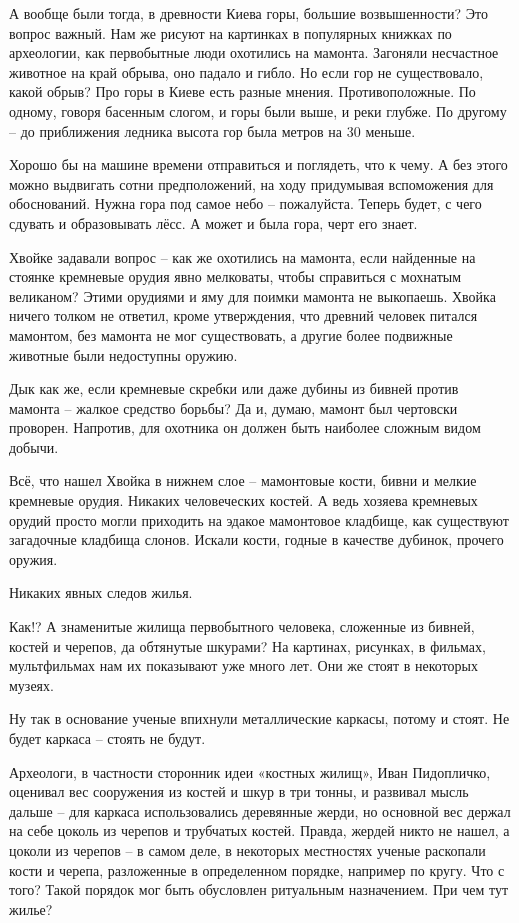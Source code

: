 А вообще были тогда, в древности Киева горы, большие возвышенности? Это вопрос важный. Нам же рисуют на картинках в популярных книжках по археологии, как первобытные люди охотились на мамонта. Загоняли несчастное животное на край обрыва, оно падало и гибло. Но если гор не существовало, какой обрыв? Про горы в Киеве есть разные мнения. Противоположные. По одному, говоря басенным слогом, и горы были выше, и реки глубже. По другому – до приближения ледника высота гор была метров на 30 меньше.

Хорошо бы на машине времени отправиться и поглядеть, что к чему. А без этого можно выдвигать сотни предположений, на ходу придумывая вспоможения для обоснований. Нужна гора под самое небо – пожалуйста. Теперь будет, с чего сдувать и образовывать лёсс. А может и была гора, черт его знает.

Хвойке задавали вопрос – как же охотились на мамонта, если найденные на стоянке кремневые орудия явно мелковаты, чтобы справиться с мохнатым великаном? Этими орудиями и яму для поимки мамонта не выкопаешь. Хвойка ничего толком не ответил, кроме утверждения, что древний человек питался мамонтом, без мамонта не мог существовать, а другие более подвижные животные были недоступны оружию.

Дык как же, если кремневые скребки или даже дубины из бивней против мамонта – жалкое средство борьбы? Да и, думаю, мамонт был чертовски проворен. Напротив, для охотника он должен быть наиболее сложным видом добычи.

Всё, что нашел Хвойка в нижнем слое – мамонтовые кости, бивни и мелкие кремневые орудия. Никаких человеческих костей. А ведь хозяева кремневых орудий просто могли приходить на эдакое мамонтовое кладбище, как существуют загадочные кладбища слонов. Искали кости, годные в качестве дубинок, прочего оружия.

Никаких явных следов жилья.

Как!? А знаменитые жилища первобытного человека, сложенные из бивней, костей и черепов, да обтянутые шкурами? На картинах, рисунках, в фильмах, мультфильмах нам их показывают уже много лет. Они же стоят в некоторых музеях.

Ну так в основание ученые впихнули металлические каркасы, потому и стоят. Не будет каркаса – стоять не будут. 

Археологи, в частности сторонник идеи «костных жилищ», Иван Пидопличко, оценивал вес сооружения из костей и шкур в три тонны, и развивал мысль дальше – для каркаса использовались деревянные жерди, но основной вес держал на себе цоколь из черепов и трубчатых костей. Правда, жердей никто не нашел, а цоколи из черепов – в самом деле, в некоторых местностях ученые раскопали кости и черепа, разложенные в определенном порядке, например по кругу. Что с того? Такой порядок мог быть обусловлен ритуальным назначением. При чем тут жилье?

